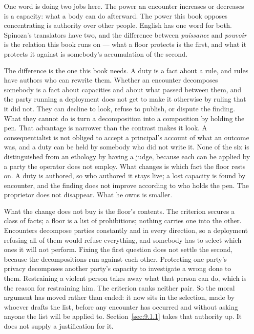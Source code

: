One word is doing two jobs here. The power an encounter increases or decreases is a capacity: what a body can do afterward. The power this book opposes concentrating is authority over other people. English has one word for both. Spinoza's translators have two, and the difference between \emph{puissance} and \emph{pouvoir} is the relation this book runs on — what a floor protects is the first, and what it protects it against is somebody's accumulation of the second.

The difference is the one this book needs. A duty is a fact about a rule, and rules have authors who can rewrite them. Whether an encounter decomposes somebody is a fact about capacities and about what passed between them, and the party running a deployment does not get to make it otherwise by ruling that it did not. They can decline to look, refuse to publish, or dispute the finding. What they cannot do is turn a decomposition into a composition by holding the pen. That advantage is narrower than the contrast makes it look. A consequentialist is not obliged to accept a principal's account of what an outcome was, and a duty can be held by somebody who did not write it. None of the six is distinguished from an ethology by having a judge, because each can be applied by a party the operator does not employ. What changes is which fact the floor rests on. A duty is authored, so who authored it stays live; a lost capacity is found by encounter, and the finding does not improve according to who holds the pen. The proprietor does not disappear. What he owns is smaller.

What the change does not buy is the floor's contents. The criterion secures a class of facts; a floor is a list of prohibitions; nothing carries one into the other. Encounters decompose parties constantly and in every direction, so a deployment refusing all of them would refuse everything, and somebody has to select which ones it will not perform. Fixing the first question does not settle the second, because the decompositions run against each other. Protecting one party's privacy decomposes another party's capacity to investigate a wrong done to them. Restraining a violent person takes away what that person can do, which is the reason for restraining him. The criterion ranks neither pair. So the moral argument has moved rather than ended: it now sits in the selection, made by whoever drafts the list, before any encounter has occurred and without asking anyone the list will be applied to. Section~\ref{sec:9.1.1} takes that authority up. It does not supply a justification for it.

